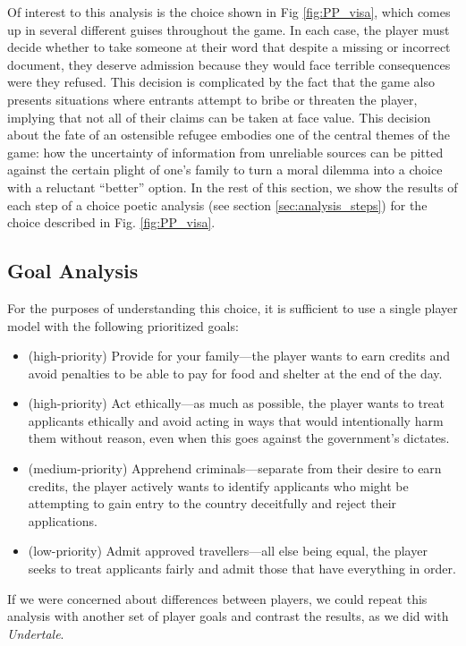 \documentclass[arts,article,submit,moreauthors,pdftex,10pt,a4paper]{Definitions/mdpi}
\begin{document}
Of interest to this analysis is the choice shown in Fig \ref{fig:PP_visa}, which comes up in several different guises throughout the game.
%
In each case, the player must decide whether to take someone at their word that despite a missing or incorrect document, they deserve admission because they would face terrible consequences were they refused.
%
This decision is complicated by the fact that the game also presents situations where entrants attempt to bribe or threaten the player, implying that not all of their claims can be taken at face value.
%
This decision about the fate of an ostensible refugee embodies one of the central themes of the game: how the uncertainty of information from unreliable sources can be pitted against the certain plight of one's family to turn a moral dilemma into a choice with a reluctant ``better'' option.
%
In the rest of this section, we show the results of each step of a choice poetic analysis (see section \ref{sec:analysis_steps}) for the choice described in Fig. \ref{fig:PP_visa}.

\subsection{Goal Analysis}

For the purposes of understanding this choice, it is sufficient to use a single player model with the following prioritized goals:
\begin{itemize}
  \item (high-priority) Provide for your family---the player wants to earn credits and avoid penalties to be able to pay for food and shelter at the end of the day.
  \item (high-priority) Act ethically---as much as possible, the player wants to treat applicants ethically and avoid acting in ways that would intentionally harm them without reason, even when this goes against the government's dictates.
  \item (medium-priority) Apprehend criminals---separate from their desire to earn credits, the player actively wants to identify applicants who might be attempting to gain entry to the country deceitfully and reject their applications.
  \item (low-priority) Admit approved travellers---all else being equal, the player seeks to treat applicants fairly and admit those that have everything in order.
\end{itemize}
If we were concerned about differences between players, we could repeat this analysis with another set of player goals and contrast the results, as we did with \emph{Undertale}.
\end{document}
